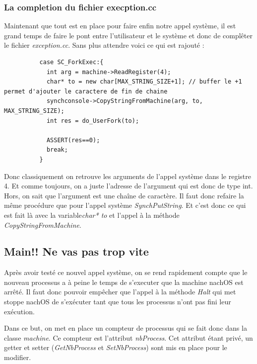 \documentclass[a4paper,10pt]{article}
\begin{document}
  \textcolor{TealBlue}{\subsubsection*{La completion du fichier execption.cc}}
  Maintenant que tout est en place pour faire enfin notre appel système, il est grand temps de faire le pont entre l'utilisateur et le système et donc
  de complêter le fichier \emph{exception.cc}. Sans plus attendre voici ce qui est rajouté : 
  \begin{lstlisting}
          case SC_ForkExec:{
            int arg = machine->ReadRegister(4);
            char* to = new char[MAX_STRING_SIZE+1]; // buffer le +1 permet d'ajouter le caractere de fin de chaine
            synchconsole->CopyStringFromMachine(arg, to, MAX_STRING_SIZE);
            int res = do_UserFork(to);

            ASSERT(res==0);
            break;
          }   
  \end{lstlisting}
  Donc classiquement on retrouve les arguments de l'appel système dans le registre 4. Et comme toujours, on a juste l'adresse de l'argument qui est donc
  de type int. Hors, on sait que l'argument est une chaîne de caractère. Il faut donc refaire la même procédure que pour l'appel 
  système \emph{SynchPutString}. Et c'est donc ce qui est fait là avec la variable\emph{char* to} et l'appel à la méthode \emph{CopyStringFromMachine}.
  
  \newpage
  \textcolor{NavyBlue}{\subsection{Main!! Ne vas pas trop vite}}
  Après avoir testé ce nouvel appel système, on se rend rapidement compte que le nouveau processus a à peine le temps de s'executer que la machine nachOS
  est arrêté. Il faut donc pouvoir empêcher que l'appel à la méthode \emph{Halt} qui met stoppe nachOS de s'exécuter tant que tous les processus n'ont pas
  fini leur exécution.
  
  Dans ce but, on met en place un compteur de processus qui se fait donc dans la classe \emph{machine}. Ce compteur est l'attribut \emph{nbProcess}. Cet
  attribut étant privé, un getter et setter (\emph{GetNbProcess} et \emph{SetNbProcess}) sont mis en place pour le modifier.
  
\end{document}
